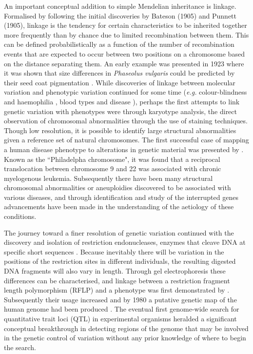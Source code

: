 An important conceptual addition to simple Mendelian inheritance is linkage. Formalised by \citet{Morgan1911} following the initial discoveries by Bateson (1905) and Punnett (1905), linkage is the tendency for certain characteristics to be inherited together more frequently than by chance due to limited recombination between them. This can be defined probabilistically as a function of the number of recombination events that are expected to occur between two positions on a chromosome based on the distance separating them. An early example was presented in 1923 where it was shown that size differences in \emph{Phaseolus vulgaris} could be predicted by their seed coat pigmentation \citep{Sax1923}. While discoveries of linkage between molecular variation and phenotypic variation continued for some time (\emph{e.g.} colour-blindness and haemophilia \citep{Bell1937}, blood types and disease \citep{Lawler1959}), perhaps the first attempts to link genetic variation with phenotypes were through karyotype analysis, the direct observation of chromosomal abnormalities through the use of staining techniques. Though low resolution, it is possible to identify large structural abnormalities given a reference set of natural chromosomes. The first successful case of mapping a human disease phenotype to alterations in genetic material was presented by \citet{Nowell1960}. Known as the ``Philadelpha chromosome", it was found that a reciprocal translocation between chromosome 9 and 22 was associated with chronic myelogenous leukemia. Subsequently there have been many structural chromosomal abnormalities or aneuploidies discovered to be associated with various diseases, and through identification and study of the interrupted genes advancements have been made in the understanding of the aetiology of these conditions.

The journey toward a finer resolution of genetic variation continued with the discovery and isolation of restriction endonucleases, enzymes that cleave DNA at specific short sequences \citep{Danna1971}. Because inevitably there will be variation in the positions of the restriction sites in different individuals, the resulting digested DNA fragments will also vary in length. Through gel electrophoresis these differences can be characterised, and linkage between a restriction fragment length polymorphism (RFLP) and a phenotype was first demonstrated by \citet{Grodzicker1974}. Subsequently their usage increased and by 1980 a putative genetic map of the human genome had been produced \citep{Botstein1980}. The eventual first genome-wide search for quantitative trait loci (QTL) in experimental organisms \citep{Paterson1988} heralded a significant conceptual breakthrough in detecting regions of the genome that may be involved in the genetic control of variation without any prior knowledge of where to begin the search.

